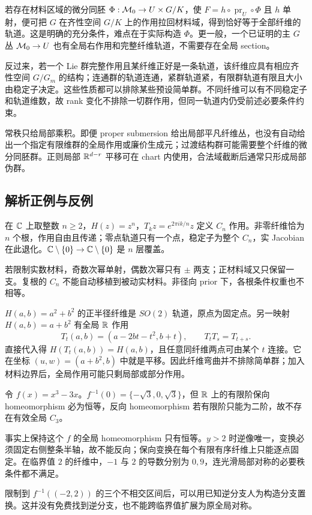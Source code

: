 若存在材料区域的微分同胚 $\Phi:\mathcal M_0\to U\times G/K$，使 $F=h\circ\operatorname{pr}_U\circ\Phi$ 且 $h$ 单射，便可把 $G$ 在齐性空间 $G/K$ 上的作用拉回材料域，得到恰好等于全部纤维的轨道。这是明确的充分条件，难点在于实际构造 $\Phi$。更一般，一个已证明的主 $G$ 丛 $\mathcal M_0\to U$ 也有全局右作用和完整纤维轨道，不需要存在全局 section。

反过来，若一个 Lie 群完整作用且某纤维正好是一条轨道，该纤维应具有相应齐性空间 $G/G_m$ 的结构；连通群的轨道连通，紧群轨道紧，有限群轨道有限且大小由稳定子决定。这些性质都可以排除某些预设简单群。不同纤维可以有不同稳定子和轨道维数，故 rank 变化不排除一切群作用，但同一轨道内仍受前述必要条件约束。

常秩只给局部乘积。即便 proper submersion 给出局部平凡纤维丛，也没有自动给出一个指定有限维群的全局作用或廉价生成元；过渡结构群可能需要整个纤维的微分同胚群。正则局部 $\mathbb R^{d-r}$ 平移可在 chart 内使用，合法域截断后通常只形成局部伪群。

\subsection{解析正例与反例}

\begin{example}[$z^n$ 的完整循环轨道]
在 $\mathbb C$ 上取整数 $n\ge2$，$H(z)=z^n$，$T_kz=e^{2\pi ik/n}z$ 定义 $C_n$ 作用。非零纤维恰为 $n$ 个根，作用自由且传递；零点轨道只有一个点，稳定子为整个 $C_n$，实 Jacobian 在此退化。$\mathbb C\setminus\{0\}\to\mathbb C\setminus\{0\}$ 是 $n$ 层覆盖。

若限制实数材料，奇数次幂单射，偶数次幂只有 $\pm$ 两支；正材料域又只保留一支。复根的 $C_n$ 不能自动移植到被动实材料。非径向 prior 下，各根条件权重也不相等。
\end{example}

\begin{example}[圆与弯曲等值线都可以有连续群]
$H(a,b)=a^2+b^2$ 的正半径纤维是 $SO(2)$ 轨道，原点为固定点。另一映射 $H(a,b)=a+b^2$ 有全局 $\mathbb R$ 作用
\begin{equation}
T_t(a,b)=(a-2bt-t^2,b+t),\qquad T_tT_s=T_{t+s}.
\end{equation}
直接代入得 $H(T_t(a,b))=H(a,b)$，且任意同纤维两点可由某个 $t$ 连接。它在坐标 $(u,w)=(a+b^2,b)$ 中就是平移。因此纤维弯曲并不排除简单群；加入材料边界后，全局作用可能只剩局部或部分作用。
\end{example}

\begin{example}[三个根不意味着全局 $C_3$]
令 $f(x)=x^3-3x$。$f^{-1}(0)=\{-\sqrt3,0,\sqrt3\}$，但 $\mathbb R$ 上的有限阶保向 homeomorphism 必为恒等，反向 homeomorphism 若有限阶只能为二阶，故不存在有效全局 $C_3$。

事实上保持这个 $f$ 的全局 homeomorphism 只有恒等。$y>2$ 时逆像唯一，变换必须固定右侧整条半轴，故不能反向；保向变换在每个有限有序纤维上只能逐点固定。在临界值 $2$ 的纤维中，$-1$ 与 $2$ 的导数分别为 $0,9$，连光滑局部对称的必要秩条件都不满足。

限制到 $f^{-1}((-2,2))$ 的三个不相交区间后，可以用已知逆分支人为构造分支置换。这并没有免费找到逆分支，也不能跨临界值扩展为原全局对称。
\end{example}

